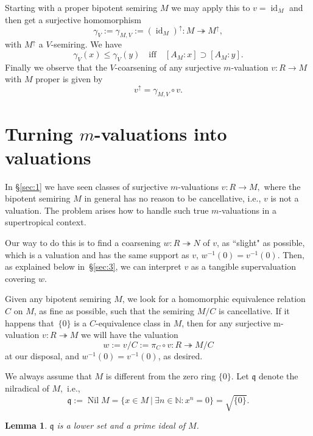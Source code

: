 \documentclass [12pt,a4paper,reqno]{amsart}
\newtheorem{lem}[thm]{Lemma}
\begin{document}
Starting with a proper bipotent semiring $M$ we may apply this to
$v = {\operatorname{id}}_M$ and then get a surjective homomorphism
$${\gamma}_V := {\gamma}_{M,V} := ({\operatorname{id}}_M)^\uparrow:
M\twoheadrightarrow {M^{\uparrow}},$$ with ${M^{\uparrow}}$ a $V$-semiring. We have
\begin{equation}\label{eq:1.4} {\gamma}_V(x) \leq {\gamma}_V(y) \quad
\text{iff} \quad [A_M:x] \supset [A_M:y].
\end{equation}
Finally we observe that the $V$-coarsening of any surjective
$m$-valuation $v:R \to M $ with $M$ proper is given by
\begin{equation}\label{eq:1.5} {v^{\uparrow}} = {\gamma}_{M,V} \circ v.
\end{equation}

\section{Turning $m$-valuations into valuations}\label{sec:2}

In  \S\ref{sec:1} we have seen classes of surjective
$m$-valuations $v:R\to M,$ where the bipotent semiring $M$ in
general has no reason to be cancellative, i.e., $v$ is not a
valuation. The problem arises how to handle such true
$m$-valuations in a supertropical context.

Our way to do this is to find a coarsening $w: R {\twoheadrightarrow} N$ of $v$,
as ``slight" as possible, which is a valuation and has the same
support as $v$, $w^{-1} (0)  = v^{-1} (0) $. Then, as explained
below in~\S\ref{sec:3}, we can interpret  $v$ as a tangible
supervaluation covering $w$.

Given any bipotent  semiring $M$, we look for a homomorphic
equivalence relation  $C$ on $M$, as fine as possible, such that
the semiring $M/C$ is cancellative. If it happens that~$\{ 0 \}$
is a $C$-equivalence class in $M$, then for any surjective
{m}-valuation $v:R {\twoheadrightarrow} M$ we will have the valuation
$$ w := v/C := \pi_C \circ v : R {\twoheadrightarrow} M/C$$
at our disposal, and  $w^{-1} (0)  = v^{-1} (0) $, as desired.

 We always assume that $M$ is different from the  zero ring $\{0\}.$ Let ${\mathfrak q}$ denote
the nilradical of $M,$ i.e.,
$${\mathfrak q}:={\operatorname{Nil}} M=\{x\in M{\ {|} \ }\exists n \in{\mathbb N}:x^n=0\}=\sqrt{\{0\}}.$$
\begin{lem} ${\mathfrak q}$ is a lower set and a prime ideal of $M$.

\end{lem}
\end{document}
